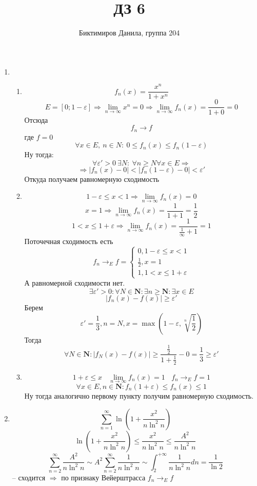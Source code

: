 \documentclass[11pt]{article}
\begin{document}
	
	\author{Биктимиров Данила, группа 204}
	\title{ДЗ 6}
	\date{}
	\maketitle
	
	\medskip
	
	\begin{enumerate}
		
		\item \begin{enumerate}
			\item $$f_n(x) = \frac{x^n}{1+x^n}$$
				$$E = [0;1-\varepsilon]\Rightarrow \lim_{n\to\infty} x^n = 0\Rightarrow \lim_{n\to\infty} f_n(x) = \frac{0}{1+0} = 0$$ Отсюда $$f_n \to f$$ где $f=0$ $$ \forall x \in E, \: n\in N: \: 0\le f_n(x) \le f_n(1-\varepsilon) $$ Ну тогда:
				$$ \forall \varepsilon' > 0 \: \exists N : \: \forall n \ge N \forall x \in E \Rightarrow $$
				$$ \Rightarrow |f_n(x)-0|<|f_n(1-\varepsilon)-0|< \varepsilon'$$ Откуда получаем равномерную сходимость
			\item $$1-\varepsilon \le x < 1 \Rightarrow \lim_{n\to\infty} f_n(x) = 0$$
				$$ x = 1 \Rightarrow \lim_{n\to\infty} f_n(x) = \frac{1}{1+1} = \frac{1}{2}$$ $$ 1<x\le1+\varepsilon  \Rightarrow \lim_{n\to\infty} f_n(x) = \frac{1}{\frac{1}{\infty}+1} = 1$$
				Поточечная сходимость есть
				$$ f_n\to_E f = \begin{cases}
					0, 1-\varepsilon \le x < 1\\
					\frac{1}{2}, x=1\\
					1, 1< x\le 1+\varepsilon
				\end{cases}$$ А равномерной сходимости нет. 
				$$ \exists \varepsilon' > 0: \forall N \in \mathbf{N}: \exists n \ge \mathbf{N}: \exists x \in E$$ $$ |f_n(x)-f(x)|\ge \varepsilon' $$
				Берем $$ \varepsilon' = \frac{1}{3}, n = N, x= \max \left(1-\varepsilon, \sqrt[n]{\frac{1}{2}}\right) $$ Тогда $$ \forall N \in \mathbf{N}: |f_N(x)-f(x)|\ge \frac{\frac{1}{2}}{1+\frac{1}{2}}- 0= \frac{1}{3}\ge \varepsilon' $$
			\item $$1+\varepsilon \le x \:\:\:\: \lim_{n\to\infty} f_n(x) = 1 \:\:\:\: f_n \to_E f=1$$ $$ \forall x \in E, n \in \mathbf{N}: f_n(1+\varepsilon)\le f_n(x)\le 1 $$ Ну тогда аналогично первому пункту получим равномерную сходимость.
		\end{enumerate}
		\item $$\sum_{n=1}^{\infty} \ln \left(1+ \frac{x^2}{n \ln^2 n}\right)$$ $$\ln \left(1+\frac{x^2}{n\ln^2 n}\right)\le \frac{x^2}{n \ln^2 n}\le \frac{A^2}{n \ln^2 n}$$ $$\sum_{n =2}^{\infty} \frac{A^2}{n \ln^2 n} \sim A^2 \sum_{n=2}^{\infty} \frac{1}{n \ln^2 n} \sim \int_{2}^{+\infty} \frac{1}{n \ln^2 n} dn = \frac{1}{\ln 2}$$ -- сходится $\Rightarrow$ по признаку Вейерштрасса $f_n\to_E f$

\end{enumerate}
\end{document}
